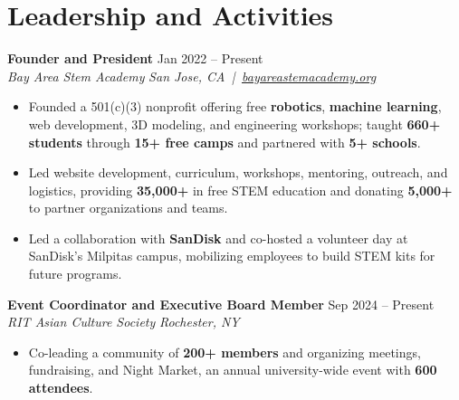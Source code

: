 \documentclass[10pt,letterpaper]{article}
\newif\ifresumeFirstRole
\newcommand{\resumeRole}[4]{%
  \ifresumeFirstRole
    \global\resumeFirstRolefalse
  \else
    \vspace{0pt plus 1fill}%
  \fi
  \textbf{#1} \hfill #2\\
  \textit{#3} \hfill \textit{#4}
}
\begin{document}
\section*{Leadership and Activities}
\resumeRole{Founder and President}{Jan 2022 -- Present}{Bay Area Stem Academy}{San Jose, CA \,|\, \href{https://bayareastemacademy.org}{bayareastemacademy.org}}
\begin{itemize}
  \item Founded a 501(c)(3) nonprofit offering free \textbf{robotics}, \textbf{machine learning}, web development, 3D modeling, and engineering workshops; taught \textbf{660+ students} through \textbf{15+ free camps} and partnered with \textbf{5+ schools}.
  \item Led website development, curriculum, workshops, mentoring, outreach, and logistics, providing \textbf{\textdollar{}35,000+} in free STEM education and donating \textbf{\textdollar{}5,000+} to partner organizations and teams.
  \item Led a collaboration with \textbf{SanDisk} and co-hosted a volunteer day at SanDisk's Milpitas campus, mobilizing employees to build STEM kits for future programs.
\end{itemize}

\resumeRole{Event Coordinator and Executive Board Member}{Sep 2024 -- Present}{RIT Asian Culture Society}{Rochester, NY}
\begin{itemize}
  \item Co-leading a community of \textbf{200+ members} and organizing meetings, fundraising, and Night Market, an annual university-wide event with \textbf{600 attendees}.
\end{itemize}
\end{document}
